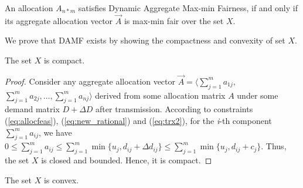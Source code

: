 \begin{definition}
    An allocation $A_{n*m}$ satisfies Dynamic Aggregate Max-min Fairness, if and only if its aggregate allocation vector $\vec A$ is max-min fair over the set $X$.
\end{definition}

We prove that DAMF exists by showing the compactness and convexity of set $X$. 
\begin{lemma}
    The set $X$ is compact.
\label{lem:compact}
\end{lemma}

\begin{proof}
Consider any aggregate allocation vector $\vec{A} = \langle\sum_{j=1}^m a_{1j}, \allowbreak $ $\sum_{j=1}^m a_{2j},\allowbreak \dots, \allowbreak \sum_{j=1}^m a_{nj}\rangle$ derived from some allocation matrix $A$ under some demand matrix $D + \Delta D$ after transmission. According to constraints (\ref{eq:allocfeas}), (\ref{eq:new_rational}) and (\ref{eq:trx2}), for the \textit{i}-th component $\sum_{j=1}^m a_{ij}$, we have $0 \leq \sum_{j=1}^m a_{ij} \leq \sum_{j=1}^m \min\{u_j, d_{ij} +\Delta d_{ij}\} \leq \sum_{j=1}^m \min\{u_j, d_{ij} +c_j\}$. Thus, the set $X$ is closed and bounded. Hence, it is compact.
\end{proof}

\begin{lemma}
    The set $X$ is convex.
\label{lem:convex}
\end{lemma}

